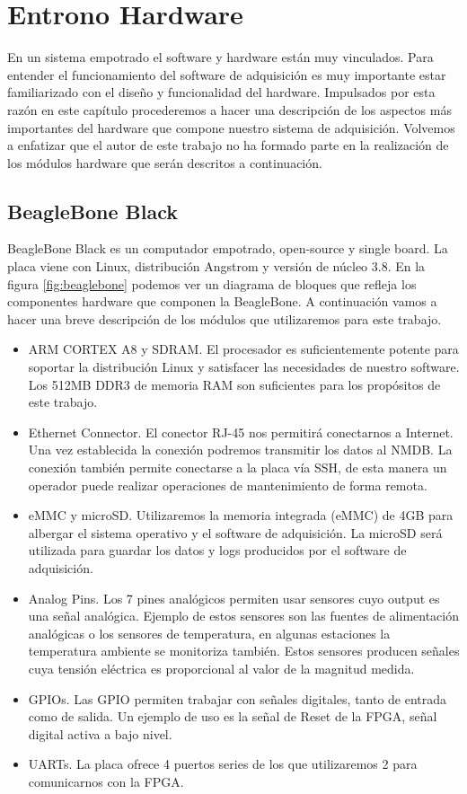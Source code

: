 \chapter{Entrono Hardware}
\label{entornoHW}

En un sistema empotrado el software y hardware están muy vinculados. Para entender el funcionamiento del software de adquisición es muy importante
estar familiarizado con el diseño y funcionalidad del hardware. Impulsados por esta razón en este capítulo procederemos a hacer una descripción de los
aspectos más importantes del hardware que compone nuestro sistema de adquisición. Volvemos a enfatizar que el autor de este trabajo no ha formado
parte  en la realización de los módulos hardware que serán descritos a continuación.
\section{BeagleBone Black}
	BeagleBone Black\cite{Beagle}\cite{BeagleWiki} es un computador empotrado, open-source y single board. La placa viene con Linux, distribución
	Angstrom y versión de núcleo 3.8. En la figura \ref{fig:beaglebone} podemos ver un diagrama de bloques que refleja los componentes hardware
	que componen la BeagleBone. A continuación vamos a hacer una breve descripción de los módulos que utilizaremos para este trabajo.
	\begin{itemize}
		\item 	ARM CORTEX A8\cite{BeagleCore} y SDRAM. El procesador es suficientemente potente para soportar la distribución Linux y
			satisfacer las necesidades de nuestro software. Los 512MB DDR3 de memoria RAM son suficientes para los propósitos de este
			trabajo.
		\item 	Ethernet Connector. El conector RJ-45 nos permitirá conectarnos a Internet. Una vez establecida la conexión podremos
			transmitir los datos al NMDB. La conexión también permite conectarse a la placa vía SSH, de esta manera un operador puede
			realizar operaciones de mantenimiento de forma remota. 
		\item	eMMC y microSD. Utilizaremos la memoria integrada (eMMC) de 4GB para albergar el sistema operativo y el software de
			adquisición. La microSD será utilizada para guardar los datos y logs producidos por el software de adquisición.
		\item 	Analog Pins. Los 7 pines analógicos permiten usar sensores cuyo output es una señal analógica. Ejemplo de estos sensores son
			las fuentes de alimentación analógicas o los sensores de temperatura, en algunas estaciones la temperatura ambiente se
			monitoriza también. Estos sensores producen señales cuya tensión eléctrica es proporcional al valor de la magnitud medida. 
		\item 	GPIOs. Las GPIO permiten trabajar con señales digitales, tanto de entrada como de salida. Un ejemplo de uso es la señal de
		  	Reset de la FPGA, señal digital activa a bajo nivel.
		\item	UARTs. La placa ofrece 4 puertos series de los que utilizaremos 2 para comunicarnos con la FPGA.
	\end{itemize}
